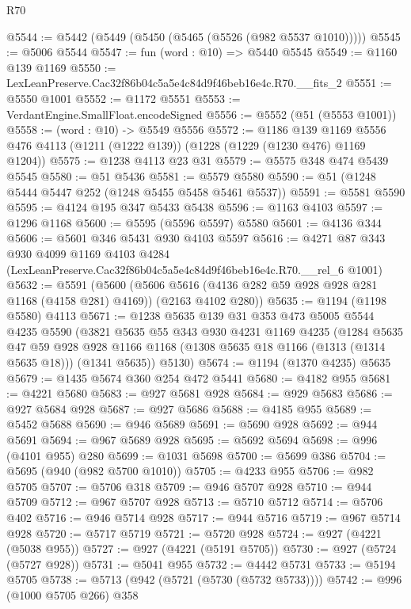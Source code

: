 \begin{lexlean}{R70}
\begin{coremodule}
@5544 := @5442 (@5449 (@5450 (@5465 (@5526 (@982 @5537 @1010)))))
@5545 := @5006 @5544
@5547 := fun (word : @10) => @5440 @5545
@5549 := @1160 @139 @1169
@5550 := LexLeanPreserve.Cac32f86b04c5a5e4c84d9f46beb16e4c.R70.__fits_2
@5551 := @5550 @1001
@5552 := @1172 @5551
@5553 := VerdantEngine.SmallFloat.encodeSigned
@5556 := @5552 (@51 (@5553 @1001))
@5558 := (word : @10) -> @5549 @5556
@5572 := @1186
    @139
    @1169
    @5556
    @476
    @4113
    (@1211 (@1222 @139))
    (@1228 (@1229 (@1230 @476) @1169 @1204))
@5575 := @1238 @4113 @23 @31
@5579 := @5575 @348 @474 @5439 @5545
@5580 := @51 @5436
@5581 := @5579 @5580
@5590 := @51 (@1248 @5444 @5447 @252 (@1248 @5455 @5458 @5461 @5537))
@5591 := @5581 @5590
@5595 := @4124 @195 @347 @5433 @5438
@5596 := @1163 @4103
@5597 := @1296 @1168
@5600 := @5595 (@5596 @5597) @5580
@5601 := @4136 @344
@5606 := @5601 @346 @5431 @930 @4103 @5597
@5616 := @4271
    @87
    @343
    @930
    @4099
    @1169
    @4103
    @4284
    (LexLeanPreserve.Cac32f86b04c5a5e4c84d9f46beb16e4c.R70.__rel_6 @1001)
@5632 := @5591
    (@5600
      (@5606 @5616 (@4136 @282 @59 @928 @928 @281 @1168 (@4158 @281) @4169))
      (@2163 @4102 @280))
@5635 := @1194 (@1198 @5580) @4113
@5671 := @1238
    @5635
    @139
    @31
    @353
    @473
    @5005
    @5544
    @4235
    @5590
    (@3821
      @5635
      @55
      @343
      @930
      @4231
      @1169
      @4235
      (@1284
        @5635
        @47
        @59
        @928
        @928
        @1166
        @1168
        (@1308 @5635 @18 @1166 (@1313 (@1314 @5635 @18)))
        (@1341 @5635))
      @5130)
@5674 := @1194 (@1370 @4235) @5635
@5679 := @1435 @5674 @360 @254 @472 @5441
@5680 := @4182 @955
@5681 := @4221 @5680
@5683 := @927 @5681 @928
@5684 := @929 @5683
@5686 := @927 @5684 @928
@5687 := @927 @5686
@5688 := @4185 @955
@5689 := @5452 @5688
@5690 := @946 @5689
@5691 := @5690 @928
@5692 := @944 @5691
@5694 := @967 @5689 @928
@5695 := @5692 @5694
@5698 := @996 (@4101 @955) @280
@5699 := @1031 @5698
@5700 := @5699 @386
@5704 := @5695 (@940 (@982 @5700 @1010))
@5705 := @4233 @955
@5706 := @982 @5705
@5707 := @5706 @318
@5709 := @946 @5707 @928
@5710 := @944 @5709
@5712 := @967 @5707 @928
@5713 := @5710 @5712
@5714 := @5706 @402
@5716 := @946 @5714 @928
@5717 := @944 @5716
@5719 := @967 @5714 @928
@5720 := @5717 @5719
@5721 := @5720 @928
@5724 := @927 (@4221 (@5038 @955))
@5727 := @927 (@4221 (@5191 @5705))
@5730 := @927 (@5724 (@5727 @928))
@5731 := @5041 @955
@5732 := @4442 @5731
@5733 := @5194 @5705
@5738 := @5713 (@942 (@5721 (@5730 (@5732 @5733))))
@5742 := @996 (@1000 @5705 @266) @358

\end{coremodule}
\end{lexlean}
